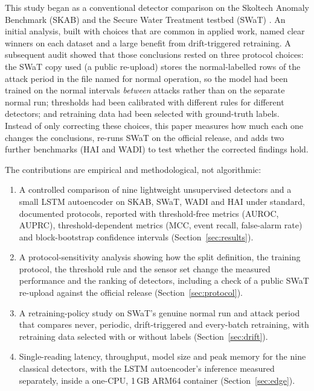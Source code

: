 \documentclass[11pt]{article}
\begin{document}
This study began as a conventional detector comparison on the Skoltech Anomaly
Benchmark (SKAB) \citep{skab} and the Secure Water Treatment testbed (SWaT)
\citep{goh2016,mathur2016}. An initial analysis, built with choices that are
common in applied work, named clear winners on each dataset and a large benefit
from drift-triggered retraining. A subsequent audit showed that those conclusions
rested on three protocol choices: the SWaT copy used (a public re-upload) stores
the normal-labelled rows of the attack period in the file named for normal
operation, so the model had been trained on the normal intervals \emph{between}
attacks rather than on the separate normal run; thresholds had been calibrated
with different rules for different detectors; and retraining data had been
selected with ground-truth labels. Instead of only correcting these choices, this
paper measures how much each one changes the conclusions, re-runs SWaT on the official
release, and adds two further benchmarks (HAI and WADI) to test whether the corrected
findings hold.

The contributions are empirical and methodological, not algorithmic:
\begin{enumerate}
\item A controlled comparison of nine lightweight unsupervised detectors and a
small LSTM autoencoder on SKAB, SWaT, WADI and HAI under standard, documented protocols,
reported with threshold-free metrics (AUROC, AUPRC), threshold-dependent
metrics (MCC, event recall, false-alarm rate) and block-bootstrap confidence
intervals (Section~\ref{sec:results}).
\item A protocol-sensitivity analysis showing how the split definition, the
training protocol, the threshold rule and the sensor set change the measured
performance and the ranking of detectors, including a check of a public SWaT re-upload
against the official release (Section~\ref{sec:protocol}).
\item A retraining-policy study on SWaT's genuine normal run and attack period
that compares never, periodic, drift-triggered and every-batch retraining, with
retraining data selected with or without labels (Section~\ref{sec:drift}).
\item Single-reading latency, throughput, model size and peak memory for the nine
classical detectors, with the LSTM autoencoder's inference measured separately, inside a one-CPU, 1\,GB ARM64 container (Section~\ref{sec:edge}).
\end{enumerate}
\end{document}
